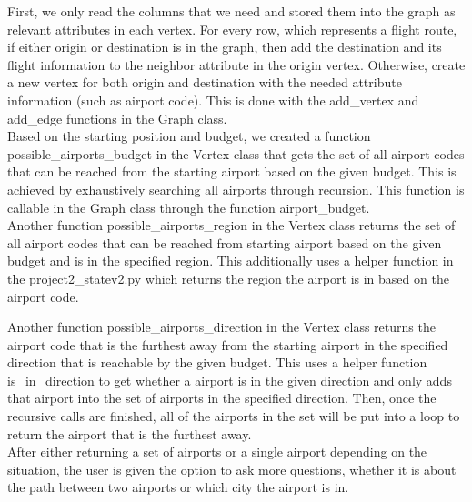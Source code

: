 \documentclass[fontsize=11pt]{article}
\begin{document}
First, we only read the columns that we need and stored them into the graph as relevant attributes in each vertex. For every row, which represents a flight route, if either origin or destination is in the graph, then add the destination and its flight information to the neighbor attribute in the origin vertex. Otherwise, create a new vertex for both origin and destination with the needed attribute information (such as airport code). This is done with the add\_vertex and add\_edge functions in the Graph class.\\

Based on the starting position and budget, we created a function possible\_airports\_budget in the Vertex class that gets the set of all airport codes that can be reached from the starting airport based on the given budget. This is achieved by exhaustively searching all airports through recursion. This function is callable in the Graph class through the function airport\_budget.\\

Another function possible\_airports\_region in the Vertex class returns the set of all airport codes that can be reached from starting airport based on the given budget and is in the specified region. This additionally uses a helper function in the project2\_statev2.py which returns the region the airport is in based on the airport code.

Another function possible\_airports\_direction in the Vertex class returns the airport code that is the furthest away from the starting airport in the specified direction that is reachable by the given budget. This uses a helper function is\_in\_direction to get whether a airport is in the given direction and only adds that airport into the set of airports in the specified direction. Then, once the recursive calls are finished, all of the airports in the set will be put into a loop to return the airport that is the furthest away.\\

After either returning a set of airports or a single airport depending on the situation, the user is given the option to ask more questions, whether it is about the path between two airports or which city the airport is in.\\
\end{document}
